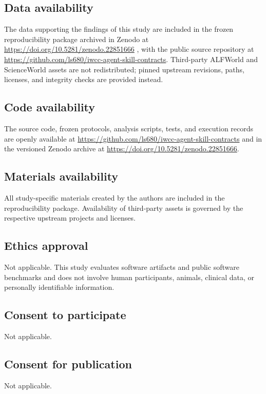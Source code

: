 \documentclass[pdflatex,sn-basic]{sn-jnl}
\begin{document}
\subsection*{Data availability}
The data supporting the findings of this study are included in the frozen
reproducibility package archived in Zenodo at
\url{https://doi.org/10.5281/zenodo.22851666} \citep{song2026iwcc}, with the
public source repository at
\url{https://github.com/ls680/iwcc-agent-skill-contracts}. Third-party ALFWorld
and ScienceWorld assets are not redistributed; pinned upstream revisions,
paths, licenses, and integrity checks are provided instead.

\subsection*{Code availability}
The source code, frozen protocols, analysis scripts, tests, and execution
records are openly available at
\url{https://github.com/ls680/iwcc-agent-skill-contracts} and in the versioned
Zenodo archive at \url{https://doi.org/10.5281/zenodo.22851666}.

\subsection*{Materials availability}
All study-specific materials created by the authors are included in the
reproducibility package. Availability of third-party assets is governed by the
respective upstream projects and licenses.

\subsection*{Ethics approval}
Not applicable. This study evaluates software artifacts and public software
benchmarks and does not involve human participants, animals, clinical data, or
personally identifiable information.

\subsection*{Consent to participate}
Not applicable.

\subsection*{Consent for publication}
Not applicable.
\end{document}
